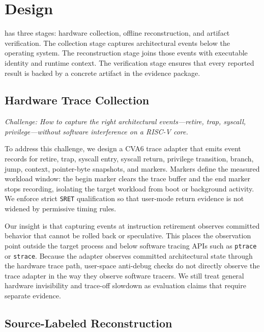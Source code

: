 \section{Design}
\label{sec:design}

\rvmt has three stages: hardware collection, offline reconstruction, and
artifact verification.
The collection stage captures architectural events below the operating
system.
The reconstruction stage joins those events with executable identity and
runtime context.
The verification stage ensures that every reported result is backed by a
concrete artifact in the evidence package.



\subsection{Hardware Trace Collection}
\label{sec:design:collection}

\emph{Challenge: How to capture the right architectural events---retire, trap,
syscall, privilege---without software interference on a RISC-V core.}

To address this challenge, we design a CVA6 trace adapter that emits event
records for retire, trap, syscall entry, syscall return, privilege
transition, branch, jump, context, pointer-byte snapshots, and markers.
Markers define the measured workload window: the begin marker clears the
trace buffer and the end marker stops recording, isolating the target
workload from boot or background activity.
We enforce strict \texttt{SRET} qualification so that user-mode return
evidence is not widened by permissive timing rules.

Our insight is that capturing events at instruction retirement observes
committed behavior that cannot be rolled back or speculative.
This places the observation point outside the target process and below
software tracing APIs such as \texttt{ptrace} or \texttt{strace}.
Because the adapter observes committed architectural state through the
hardware trace path, user-space anti-debug checks do not directly observe
the trace adapter in the way they observe software tracers. We still treat
general hardware invisibility and trace-off slowdown as evaluation claims
that require separate evidence.

\subsection{Source-Labeled Reconstruction}
\label{sec:design:labels}

